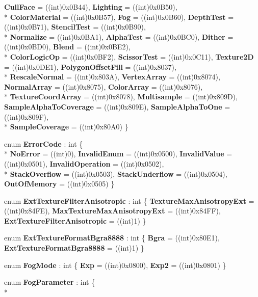 \begin{DoxyCompactItemize}
{\bfseries Cull\-Face} = ((int)0x0\-B44), 
{\bfseries Lighting} = ((int)0x0\-B50), 
\\*
{\bfseries Color\-Material} = ((int)0x0\-B57), 
{\bfseries Fog} = ((int)0x0\-B60), 
{\bfseries Depth\-Test} = ((int)0x0\-B71), 
{\bfseries Stencil\-Test} = ((int)0x0\-B90), 
\\*
{\bfseries Normalize} = ((int)0x0\-B\-A1), 
{\bfseries Alpha\-Test} = ((int)0x0\-B\-C0), 
{\bfseries Dither} = ((int)0x0\-B\-D0), 
{\bfseries Blend} = ((int)0x0\-B\-E2), 
\\*
{\bfseries Color\-Logic\-Op} = ((int)0x0\-B\-F2), 
{\bfseries Scissor\-Test} = ((int)0x0\-C11), 
{\bfseries Texture2\-D} = ((int)0x0\-D\-E1), 
{\bfseries Polygon\-Offset\-Fill} = ((int)0x8037), 
\\*
{\bfseries Rescale\-Normal} = ((int)0x803\-A), 
{\bfseries Vertex\-Array} = ((int)0x8074), 
{\bfseries Normal\-Array} = ((int)0x8075), 
{\bfseries Color\-Array} = ((int)0x8076), 
\\*
{\bfseries Texture\-Coord\-Array} = ((int)0x8078), 
{\bfseries Multisample} = ((int)0x809\-D), 
{\bfseries Sample\-Alpha\-To\-Coverage} = ((int)0x809\-E), 
{\bfseries Sample\-Alpha\-To\-One} = ((int)0x809\-F), 
\\*
{\bfseries Sample\-Coverage} = ((int)0x80\-A0)
 \}
\item 
enum {\bfseries Error\-Code} \-: int \{ \\*
{\bfseries No\-Error} = ((int)0), 
{\bfseries Invalid\-Enum} = ((int)0x0500), 
{\bfseries Invalid\-Value} = ((int)0x0501), 
{\bfseries Invalid\-Operation} = ((int)0x0502), 
\\*
{\bfseries Stack\-Overflow} = ((int)0x0503), 
{\bfseries Stack\-Underflow} = ((int)0x0504), 
{\bfseries Out\-Of\-Memory} = ((int)0x0505)
 \}
\item 
enum {\bfseries Ext\-Texture\-Filter\-Anisotropic} \-: int \{ {\bfseries Texture\-Max\-Anisotropy\-Ext} = ((int)0x84\-F\-E), 
{\bfseries Max\-Texture\-Max\-Anisotropy\-Ext} = ((int)0x84\-F\-F), 
{\bfseries Ext\-Texture\-Filter\-Anisotropic} = ((int)1)
 \}
\item 
enum {\bfseries Ext\-Texture\-Format\-Bgra8888} \-: int \{ {\bfseries Bgra} = ((int)0x80\-E1), 
{\bfseries Ext\-Texture\-Format\-Bgra8888} = ((int)1)
 \}
\item 
enum {\bfseries Fog\-Mode} \-: int \{ {\bfseries Exp} = ((int)0x0800), 
{\bfseries Exp2} = ((int)0x0801)
 \}
\item 
enum {\bfseries Fog\-Parameter} \-: int \{ \\*

\end{DoxyCompactItemize}

